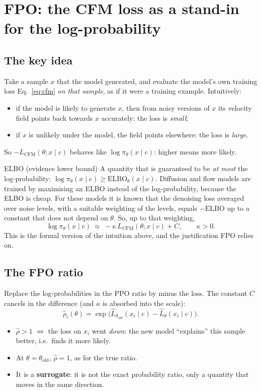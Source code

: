 \documentclass[11pt,a4paper]{article}
\newcommand{\Lc}{L_{\mathrm{CFM}}}
\newcommand{\Lh}{\hat L}
\begin{document}
\section{FPO: the CFM loss as a stand-in for the log-probability}\label{sec:fpo}

\subsection{The key idea}
Take a sample $x$ that the model generated, and evaluate the model's own training loss Eq.~\eqref{eq:cfm} \emph{on that sample}, as if it were a training example. Intuitively:
\begin{itemize}
\item if the model is likely to generate $x$, then from noisy versions of $x$ its velocity field points back towards $x$ accurately: the loss is \emph{small};
\item if $x$ is unlikely under the model, the field points elsewhere: the loss is \emph{large}.
\end{itemize}
So $-\Lc(\theta;x\mid c)$ behaves like $\log\pi_\theta(x\mid c)$: higher means more likely.

\begin{newc}{ELBO (evidence lower bound)}
A quantity that is guaranteed to be \emph{at most} the log-probability: $\log\pi_\theta(x\mid c)\ge\mathrm{ELBO}_\theta(x\mid c)$. Diffusion and flow models are trained by maximising an ELBO instead of the log-probability, because the ELBO is cheap. For these models it is known that the denoising loss averaged over noise levels, with a suitable weighting of the levels, equals $-\mathrm{ELBO}$ up to a constant that does not depend on $\theta$. So, up to that weighting,
\[\log\pi_\theta(x\mid c)\ \approx\ -\kappa\,\Lc(\theta;x\mid c)+C,\qquad\kappa>0.\]
This is the formal version of the intuition above, and the justification FPO relies on.
\end{newc}

\subsection{The FPO ratio}
Replace the log-probabilities in the PPO ratio by minus the loss. The constant $C$ cancels in the difference (and $\kappa$ is absorbed into the scale):
\begin{equation}
\hat\rho_i(\theta)=\exp\Big(\Lh_{\theta_{\mathrm{old}}}(x_i\mid c)-\Lh_{\theta}(x_i\mid c)\Big).
\label{eq:fporatio}
\end{equation}
\begin{itemize}
\item $\hat\rho>1$ $\Leftrightarrow$ the loss on $x_i$ went \emph{down}: the new model ``explains'' this sample better, i.e.\ finds it more likely.
\item At $\theta=\theta_{\mathrm{old}}$, $\hat\rho=1$, as for the true ratio.
\item It is a \textbf{surrogate}: it is not the exact probability ratio, only a quantity that moves in the same direction.
\end{itemize}
\end{document}
